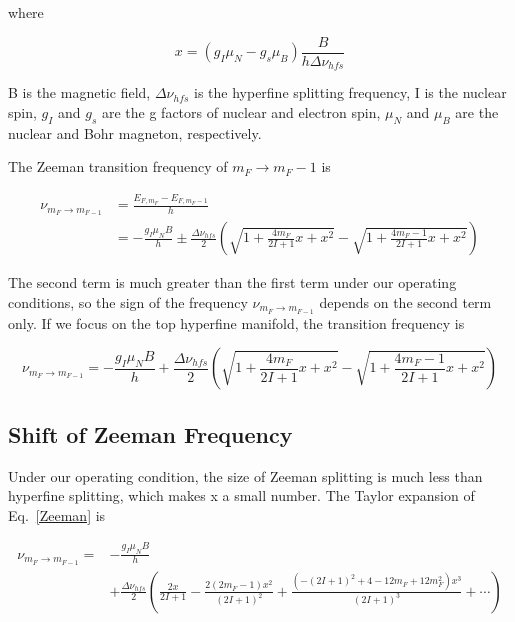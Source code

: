 where

\begin{equation}
x=(g_{I}\mu_{N}-g_{s}\mu_{B})\frac{B}{h\Delta \nu_{hfs}}
\end{equation}

B is the magnetic field, $\Delta \nu_{hfs}$ is the hyperfine splitting frequency, I is the nuclear spin, $g_{I}$ and $g_{s}$ are the g factors of nuclear and electron spin, $\mu_{N}$ and $\mu_{B}$ are the nuclear and Bohr magneton, respectively. 

The Zeeman transition frequency of $m_{F} \rightarrow m_{F} - 1$ is 

\begin{equation}
\begin{split}
\nu_{m_{F}\rightarrow m_{F-1}} &=\frac{E_{F,m_{F}}-E_{F,m_{F}-1}}{h} \\
&= -\frac{g_{I}\mu_{N}B}{h}\pm \frac{\Delta \nu_{hfs}}{2}\left(\sqrt{1+\frac{4m_{F}}{2I+1}x+x^{2}}-\sqrt{1+\frac{4m_{F}-1}{2I+1}x+x^{2}}\right)
\end{split}
\end{equation}

The second term is much greater than the first term under our operating conditions, so the sign of the frequency $\nu_{m_{F}\rightarrow m_{F-1}}$ depends on the second term only. If we focus on the top hyperfine manifold, the transition frequency is

\begin{equation}\label{Zeeman}
\nu_{m_{F}\rightarrow m_{F-1}} = -\frac{g_{I}\mu_{N}B}{h}+ \frac{\Delta \nu_{hfs}}{2}\left(\sqrt{1+\frac{4m_{F}}{2I+1}x+x^{2}}-\sqrt{1+\frac{4m_{F}-1}{2I+1}x+x^{2}}\right)
\end{equation}

\subsection{Shift of Zeeman Frequency}

Under our operating condition, the size of Zeeman splitting is much less than hyperfine splitting, which makes x a small number. The Taylor expansion of Eq.~\ref{Zeeman} is

\begin{equation}\label{Taylorwithx}
\begin{split}
\nu_{m_{F}\rightarrow m_{F-1}}=&-\frac{g_{I}\mu_{N}B}{h}\\
&+\frac{\Delta\nu_{hfs}}{2}\left(\frac{2x}{2I+1}-\frac{2(2m_{F}-1)x^{2}}{(2I+1)^{2}}+\frac{(-(2I+1)^{2}+4-12m_{F}+12m_{F}^{2})x^{3}}{(2I+1)^{3}}+\cdots\right)
\end{split}
\end{equation}
 
